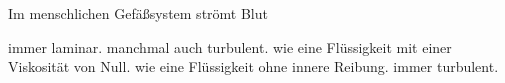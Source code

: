 \documentclass[11pt]{exam}
\begin{document}
\begin{questions}
\vspace{3mm}\question Im menschlichen Gefäßsystem strömt Blut

\begin{choices}
	\choice immer laminar.
	\choice manchmal auch turbulent.
	\choice wie eine Flüssigkeit mit einer Viskosität von Null.
	\choice wie eine Flüssigkeit ohne innere Reibung.
	\choice immer turbulent.
\end{choices}

\vspace{3mm}\end{questions}
\end{document}
